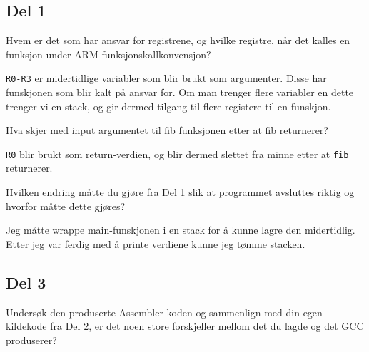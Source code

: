 \documentclass{../../myassignment}
\begin{document}
	\subsection*{Del 1}
	\begin{problem}
	    Hvem er det som har ansvar for registrene, og hvilke registre, når det kalles en funksjon under ARM funksjonskallkonvensjon?

	\end{problem}

	\begin{answer}
		\texttt{R0-R3} er midertidlige variabler som blir brukt som argumenter. Disse har funskjonen som blir kalt på ansvar for. Om man trenger flere variabler en dette trenger vi en stack, og gir dermed tilgang til flere registere til en funskjon.

	\end{answer}

	\begin{problem}
	    Hva skjer med input argumentet til fib funksjonen etter at fib returnerer?

	\end{problem}
		\texttt{R0} blir brukt som return-verdien, og blir dermed slettet fra minne etter at \texttt{fib} returnerer.

	\begin{answer}

	\end{answer}

	\begin{problem}
		Hvilken endring måtte du gjøre fra Del 1 slik at programmet avsluttes riktig og hvorfor måtte dette gjøres?

	\end{problem}

	\begin{answer}
		Jeg måtte wrappe main-funskjonen i en stack for å kunne lagre den midertidlig. Etter jeg var ferdig med å printe verdiene kunne jeg tømme stacken.

	\end{answer}

	\pagebreak
	\subsection*{Del 3}

	\begin{problem}
    Undersøk den produserte Assembler koden og sammenlign med din egen kildekode fra Del 2, er det noen store forskjeller mellom det du lagde og det GCC produserer?

	\end{problem}
\end{document}

